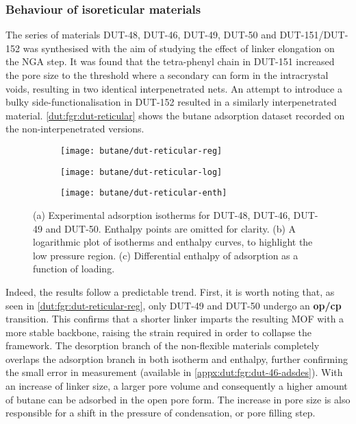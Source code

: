\subsubsection{Behaviour of isoreticular materials}

The series of materials DUT-48, DUT-46, DUT-49, DUT-50 and DUT-151/DUT-152
was synthesised with the aim of studying the effect of linker 
elongation on the NGA step. It was found that the tetra-phenyl chain
in DUT-151 increased the pore size to the threshold 
where a secondary can form in the intracrystal voids, resulting 
in two identical interpenetrated nets. An attempt to introduce 
a bulky side-functionalisation in DUT-152 resulted in a similarly
interpenetrated material. \autoref{dut:fgr:dut-reticular} shows the
butane adsorption dataset recorded on the non-interpenetrated versions.

\begin{figure}[htb]
    \centering
    \begin{subfigure}{0.33\linewidth}
        \texttt{[image: butane/dut-reticular-reg]}%
        \caption{}\label{dut:fgr:dut-reticular-reg}
    \end{subfigure}%
    \begin{subfigure}{0.33\linewidth}
        \texttt{[image: butane/dut-reticular-log]}%
        \caption{}\label{dut:fgr:dut-reticular-log}
    \end{subfigure}%
    \begin{subfigure}{0.33\linewidth}
        \texttt{[image: butane/dut-reticular-enth]}%
        \caption{}\label{dut:fgr:dut-reticular-enth}
    \end{subfigure}%
    \caption{(a) Experimental adsorption isotherms for DUT-48, DUT-46, DUT-49 and 
    DUT-50. Enthalpy points are omitted for clarity. (b) A logarithmic plot of 
    isotherms and enthalpy curves, to highlight the low pressure region. 
    (c) Differential enthalpy of adsorption as a function of loading.}%
    \label{dut:fgr:dut-reticular}
\end{figure}


Indeed, the results follow a predictable trend. First, it is worth 
noting that, as seen in \autoref{dut:fgr:dut-reticular-reg}, only DUT-49 
and DUT-50 undergo an \textbf{op/cp} transition. This confirms that 
a shorter linker imparts the resulting MOF with a more stable backbone,
raising the strain required in order to collapse the framework.
The desorption branch of the non-flexible materials completely 
overlaps the adsorption branch in both isotherm and enthalpy, further
confirming the small error in measurement (available in 
\autoref{appx:dut:fgr:dut-46-adsdes}).
With an increase of linker size, a larger pore volume and consequently
a higher amount of butane can be adsorbed in the open pore form. 
The increase in pore size is also responsible for a shift in the pressure 
of condensation, or pore filling step.

